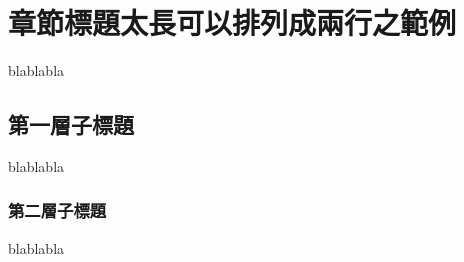 \section{章節標題太長可以排列成兩行之範例}
blablabla\cite{8643999}
\subsection{第一層子標題}
blablabla
\subsubsection{第二層子標題}
blablabla
